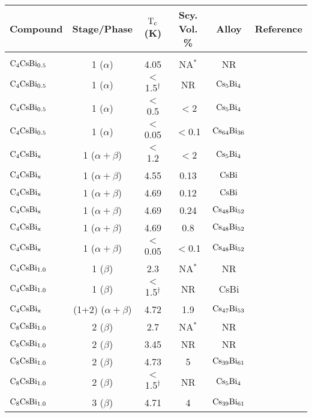 {\begin{table}
\label{mbi:tc}
\begin{center}
\begin{tabular}{|lc|cccc|}
\hline
Compound & Stage/Phase & $\rm T_c$ (K) & Scy. Vol. \%  & Alloy & Reference \\ 
\hline\\ 
$\rm C_4CsBi_{0.5}$ & 1 ($\alpha$) & 4.05 & NA$^*$ & NR & \cite{mcrae85}\\ 
$\rm C_4CsBi_{0.5}$ & 1 ($\alpha$) & $<$1.5$^{\dagger}$ & NR & $\rm Cs_5Bi_4$ & \cite{yang88}\\ 
$\rm C_4CsBi_{0.5}$ & 1 ($\alpha$) & $<$0.5 & $<$2 & $\rm Cs_5Bi_4$& \cite{E291}\\ 
$\rm C_4CsBi_{0.5}$ & 1 ($\alpha$) & $<$0.05 & $<$0.1 & $\rm Cs_{64}Bi_{36}$& \cite{stang88}\\ 
$\rm C_4CsBi_{x}$ & 1 ($\alpha + \beta$) & $<$1.2 & $<$2 & $\rm Cs_5Bi_4$ & \cite{E291}\\ 
$\rm C_4CsBi_{x}$ & 1 ($\alpha + \beta$) & 4.55 & 0.13 & $\rm CsBi$& \cite{stang88}\\ 
$\rm C_4CsBi_{x}$ & 1 ($\alpha + \beta$) & 4.69 & 0.12 & $\rm CsBi$ & \cite{stang88}\\ 
$\rm C_4CsBi_{x}$ & 1 ($\alpha + \beta$) & 4.69 & 0.24 & $\rm Cs_{48}Bi_{52}$ & \cite{stang88}\\ 
$\rm C_4CsBi_{x}$ & 1 ($\alpha + \beta$) & 4.69 & 0.8 & $\rm Cs_{48}Bi_{52}$ & \cite{stang88}\\ 
$\rm C_4CsBi_{x}$ & 1 ($\alpha + \beta$) & $<$0.05 & $<$0.1 & $\rm Cs_{48}Bi_{52}$ & \cite{stang88}\\ 
$\rm C_4CsBi_{1.0}$ & 1 ($\beta$) & 2.3 & NA$^*$ & NR &\cite{mcrae85}\\ 
$\rm C_4CsBi_{1.0}$ & 1 ($\beta$) & $<$1.5$^{\dagger}$ & NR & CsBi & \cite{yang88}\\ 
$\rm C_4CsBi_{x}$ & (1+2) ($\alpha + \beta$) & 4.72 & 1.9 & $\rm Cs_{47}Bi_{53}$ & \cite{stang88}\\ 
$\rm C_8CsBi_{1.0}$ & 2 ($\beta$) & 2.7 & NA$^*$ & NR & \cite{mcrae85}\\ 
$\rm C_8CsBi_{1.0}$ & 2 ($\beta$) & 3.45 & NR & NR & \cite{bendriss86}\\ 
$\rm C_8CsBi_{1.0}$ & 2 ($\beta$) & 4.73 & 5 & $\rm Cs_{39}Bi_{61}$ & \cite{stang88}\\ 
$\rm C_8CsBi_{1.0}$ & 2 ($\beta$) & $<$1.5$^{\dagger}$ & NR & $\rm Cs_5Bi_4$ & \cite{yang88}\\ 
$\rm C_8CsBi_{1.0}$ & 3 ($\beta$) & 4.71 & 4 & $\rm Cs_{39}Bi_{61}$ & \cite{stang88}\\ 

\end{tabular}
\end{center}
\end{table}}
